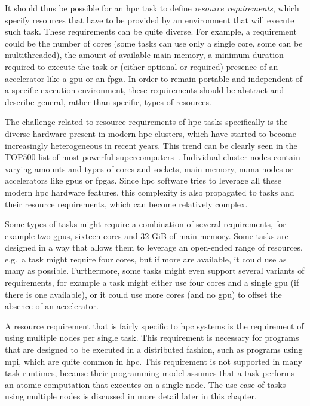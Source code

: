 It should thus be possible for an \gls{hpc} task to define
\emph{resource requirements}, which specify resources that have to be provided by an environment that
will execute such task. These requirements can be quite diverse. For example, a requirement could
be the number of cores (some tasks can use only a single core, some can be multithreaded), the
amount of available main memory, a minimum duration required to execute the task or (either
optional or required) presence of an accelerator like a \gls{gpu} or an
\gls{fpga}\@. In order to remain portable and independent of a specific execution
environment, these requirements should be abstract and describe general, rather than specific,
types of resources.

The challenge related to resource requirements of \gls{hpc} tasks specifically is
the diverse hardware present in modern \gls{hpc} clusters, which have started to
become increasingly heterogeneous in recent years. This trend can be clearly seen in the TOP500
list of most powerful supercomputers~\cite{top500analysis}. Individual cluster nodes contain
varying amounts and types of cores and sockets, main memory, \gls{numa} nodes or
accelerators like \glspl{gpu} or \glspl{fpga}. Since
\gls{hpc} software tries to leverage all these modern \gls{hpc}
hardware features, this complexity is also propagated to tasks and their resource requirements,
which can become relatively complex.

Some types of tasks might require a combination of several requirements, for example two
\glspl{gpu}, sixteen cores and 32 GiB of main memory. Some tasks are designed in a
way that allows them to leverage an open-ended range of resources, e.g.\ a task might require four
cores, but if more are available, it could use as many as possible. Furthermore, some tasks might
even support several variants of requirements, for example a task might either use four cores and a
single \gls{gpu} (if there is one available), or it could use more cores (and no \gls{gpu})
to offset the absence of an accelerator.

A resource requirement that is fairly specific to \gls{hpc} systems is the
requirement of using multiple nodes per single task. This requirement is necessary for programs
that are designed to be executed in a distributed fashion, such as programs using
\gls{mpi}, which are quite common in \gls{hpc}. This requirement
is not supported in many task runtimes, because their programming model assumes that a task
performs an atomic computation that executes on a single node. The use-case of tasks using multiple
nodes is discussed in more detail later in this chapter.

